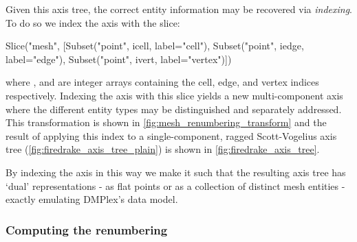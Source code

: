 \documentclass[thesis]{subfiles}
\begin{document}
Given this axis tree, the correct entity information may be recovered via \emph{indexing}.
To do so we index the  axis with the slice:
\begin{pyinline}
  Slice("mesh", [Subset("point", icell, label="cell"),
                 Subset("point", iedge, label="edge"),
                 Subset("point", ivert, label="vertex")])
\end{pyinline}
where ,  and  are integer arrays containing the cell, edge, and vertex indices respectively.
Indexing the  axis with this slice yields a new multi-component axis where the different entity types may be distinguished and separately addressed.
This transformation is shown in \cref{fig:mesh_renumbering_transform} and the result of applying this index to a single-component, ragged Scott-Vogelius axis tree (\cref{fig:firedrake_axis_tree_plain}) is shown in \cref{fig:firedrake_axis_tree}.

By indexing the  axis in this way we make it such that the resulting axis tree has `dual' representations - as flat points or as a collection of distinct mesh entities - exactly emulating DMPlex's data model.

\subsubsection{Computing the renumbering}
\end{document}
